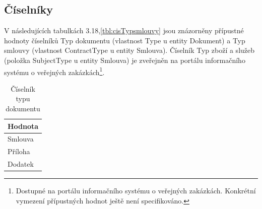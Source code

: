 \newpage

\subsection{Číselníky}

V následujících tabulkách 3.18,\ref{tbl:cisTypsmlouvy} jsou znázorněny přípustné hodnoty číselníků Typ dokumentu (vlastnost Type u entity Dokument) a Typ smlouvy (vlastnost ContractType u entity Smlouva). Číselník Typ zboží a služeb (položka SubjectType u entity Smlouva) je zveřejněn na portálu informačního systému o veřejných zakázkách\footnote{Dostupné na portálu informačního systému o veřejných zakázkách\cite{isvz}. Konkrétní vymezení přípustných hodnot ještě není specifikováno.}.

\begin{table}[h]
\centering
\begin{tabular}{l}
\label{tbl:cisTypDokumentu} \\
\textbf{Hodnota} \\
\hline
\rowcolor{validateB}Smlouva \\
\rowcolor{validateB}Příloha \\
\rowcolor{validateB}Dodatek \\
\end{tabular}
\caption{Číselník typu dokumentu}
\end{table}

